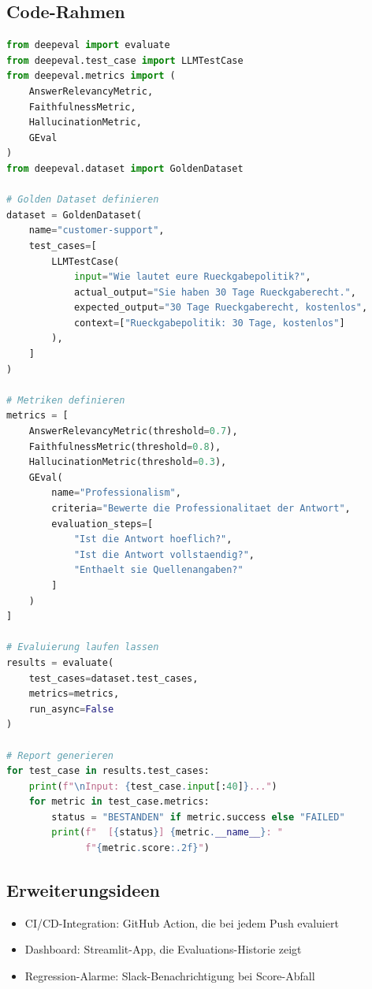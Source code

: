 \subsection*{Code-Rahmen}

\begin{lstlisting}[language=Python, caption=Evaluations-Dashboard mit DeepEval]
from deepeval import evaluate
from deepeval.test_case import LLMTestCase
from deepeval.metrics import (
    AnswerRelevancyMetric,
    FaithfulnessMetric,
    HallucinationMetric,
    GEval
)
from deepeval.dataset import GoldenDataset

# Golden Dataset definieren
dataset = GoldenDataset(
    name="customer-support",
    test_cases=[
        LLMTestCase(
            input="Wie lautet eure Rueckgabepolitik?",
            actual_output="Sie haben 30 Tage Rueckgaberecht.",
            expected_output="30 Tage Rueckgaberecht, kostenlos",
            context=["Rueckgabepolitik: 30 Tage, kostenlos"]
        ),
    ]
)

# Metriken definieren
metrics = [
    AnswerRelevancyMetric(threshold=0.7),
    FaithfulnessMetric(threshold=0.8),
    HallucinationMetric(threshold=0.3),
    GEval(
        name="Professionalism",
        criteria="Bewerte die Professionalitaet der Antwort",
        evaluation_steps=[
            "Ist die Antwort hoeflich?",
            "Ist die Antwort vollstaendig?",
            "Enthaelt sie Quellenangaben?"
        ]
    )
]

# Evaluierung laufen lassen
results = evaluate(
    test_cases=dataset.test_cases,
    metrics=metrics,
    run_async=False
)

# Report generieren
for test_case in results.test_cases:
    print(f"\nInput: {test_case.input[:40]}...")
    for metric in test_case.metrics:
        status = "BESTANDEN" if metric.success else "FAILED"
        print(f"  [{status}] {metric.__name__}: "
              f"{metric.score:.2f}")
\end{lstlisting}

\subsection*{Erweiterungsideen}
\begin{itemize}[leftmargin=*]
    \item CI/CD-Integration: GitHub Action, die bei jedem Push evaluiert
    \item Dashboard: Streamlit-App, die Evaluations-Historie zeigt
    \item Regression-Alarme: Slack-Benachrichtigung bei Score-Abfall
\end{itemize}

